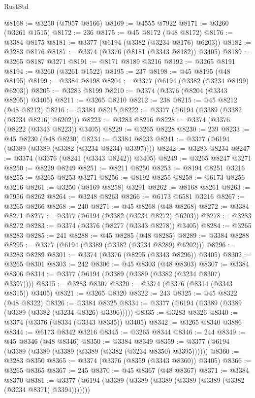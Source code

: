 \begin{lexlean}{RustStd}
\begin{coremodule}
@8168 := @3250 (@7957 @8166)
@8169 := @4555 @7922
@8171 := @3260 (@3261 @1515)
@8172 := 236
@8175 := @45 @8172 (@48 @8172)
@8176 := @3384 @8175
@8181 := @3377 (@6194 (@3382 (@3234 @8176) @6203))
@8182 := @3283 @8176
@8187 := @3374 (@3376 (@8181 (@3343 @8182)) @3405)
@8189 := @3265 @8187 @3271
@8191 := @8171 @8189 @3216
@8192 := @3265 @8191
@8194 := @3260 (@3261 @1522)
@8195 := 237
@8198 := @45 @8195 (@48 @8195)
@8199 := @3384 @8198
@8204 := @3377 (@6194 (@3382 (@3234 @8199) @6203))
@8205 := @3283 @8199
@8210 := @3374 (@3376 (@8204 (@3343 @8205)) @3405)
@8211 := @3265 @8210
@8212 := 238
@8215 := @45 @8212 (@48 @8212)
@8216 := @3384 @8215
@8222 := @3377 (@6194 (@3389 (@3382 (@3234 @8216) @6202)))
@8223 := @3283 @8216
@8228 := @3374 (@3376 (@8222 (@3343 @8223)) @3405)
@8229 := @3265 @8228
@8230 := 239
@8233 := @45 @8230 (@48 @8230)
@8234 := @3384 @8233
@8241 := @3377 (@6194 (@3389 (@3389 (@3382 (@3234 @8234) @3397))))
@8242 := @3283 @8234
@8247 := @3374 (@3376 (@8241 (@3343 @8242)) @3405)
@8249 := @3265 @8247 @3271
@8250 := @8229 @8249
@8251 := @8211 @8250
@8253 := @8194 @8251 @3216
@8255 := @3265 @8253 @3271
@8256 := @8192 @8255
@8258 := @6173 @8256 @3216
@8261 := @3250 (@8169 @8258) @3291
@8262 := @8168 @8261
@8263 := @7956 @8262
@8264 := @3248 @8263
@8266 := @6173 @6581 @3216
@8267 := @3265 @8266
@8268 := 240
@8271 := @45 @8268 (@48 @8268)
@8272 := @3384 @8271
@8277 := @3377 (@6194 (@3382 (@3234 @8272) @6203))
@8278 := @3283 @8272
@8283 := @3374 (@3376 (@8277 (@3343 @8278)) @3405)
@8284 := @3265 @8283
@8285 := 241
@8288 := @45 @8285 (@48 @8285)
@8289 := @3384 @8288
@8295 := @3377 (@6194 (@3389 (@3382 (@3234 @8289) @6202)))
@8296 := @3283 @8289
@8301 := @3374 (@3376 (@8295 (@3343 @8296)) @3405)
@8302 := @3265 @8301
@8303 := 242
@8306 := @45 @8303 (@48 @8303)
@8307 := @3384 @8306
@8314 := @3377 (@6194 (@3389 (@3389 (@3382 (@3234 @8307) @3397))))
@8315 := @3283 @8307
@8320 := @3374 (@3376 (@8314 (@3343 @8315)) @3405)
@8321 := @3265 @8320
@8322 := 243
@8325 := @45 @8322 (@48 @8322)
@8326 := @3384 @8325
@8334 := @3377 (@6194 (@3389 (@3389 (@3389 (@3382 (@3234 @8326) @3396)))))
@8335 := @3283 @8326
@8340 := @3374 (@3376 (@8334 (@3343 @8335)) @3405)
@8342 := @3265 @8340 @3886
@8344 := @6173 @8342 @3216
@8345 := @3265 @8344
@8346 := 244
@8349 := @45 @8346 (@48 @8346)
@8350 := @3384 @8349
@8359 := @3377 (@6194 (@3389 (@3389 (@3389 (@3389 (@3382 (@3234 @8350) @3395))))))
@8360 := @3283 @8350
@8365 := @3374 (@3376 (@8359 (@3343 @8360)) @3405)
@8366 := @3265 @8365
@8367 := 245
@8370 := @45 @8367 (@48 @8367)
@8371 := @3384 @8370
@8381 := @3377 (@6194 (@3389 (@3389 (@3389 (@3389 (@3389 (@3382 (@3234 @8371) @3394)))))))

\end{coremodule}
\end{lexlean}
